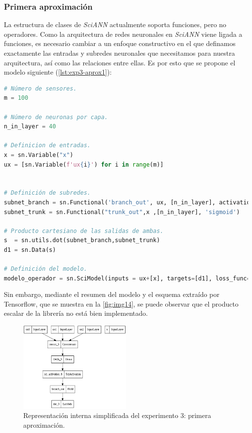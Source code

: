 \subsubsection{Primera aproximación}

La estructura de clases de \textit{SciANN} actualmente soporta funciones, pero no operadores. Como la arquitectura de redes neuronales en \textit{SciANN} viene ligada a funciones, es necesario cambiar a un enfoque constructivo en el que definamos exactamente las entradas y subredes neuronales que necesitamos para nuestra arquitectura, así como las relaciones entre ellas. Es por esto que se propone el modelo siguiente (\autoref{lst:exp3-aprox1}): 


\begin{lstlisting}[language=Python,caption={Primera aproximación para el modelo de aprendizaje de operadores.},label={lst:exp3-aprox1}]
# Número de sensores.
m = 100

# Número de neuronas por capa.
n_in_layer = 40

# Definicion de entradas.
x = sn.Variable("x")
ux = [sn.Variable(f'ux{i}') for i in range(m)]


# Definición de subredes.
subnet_branch = sn.Functional('branch_out', ux, [n_in_layer], activation='sigmoid')
subnet_trunk = sn.Functional("trunk_out",x ,[n_in_layer], 'sigmoid')

# Producto cartesiano de las salidas de ambas.
s  = sn.utils.dot(subnet_branch,subnet_trunk)
d1 = sn.Data(s)

# Definición del modelo.
modelo_operador = sn.SciModel(inputs = ux+[x], targets=[d1], loss_func='MSE',optimizer="adam")
\end{lstlisting}

Sin embargo, mediante el resumen del modelo y el esquema extraído por Tensorflow, que se muestra en la \autoref{fig:img14}, se puede observar que el producto escalar de la librería no está bien implementado.

 \begin{figure}[htbp]
    \centering
    \includegraphics[width=0.5\textwidth]{img/img14.png}
    \caption{Representación interna simplificada del experimento 3: primera aproximación.}
    \label{fig:img14}
\end{figure}

